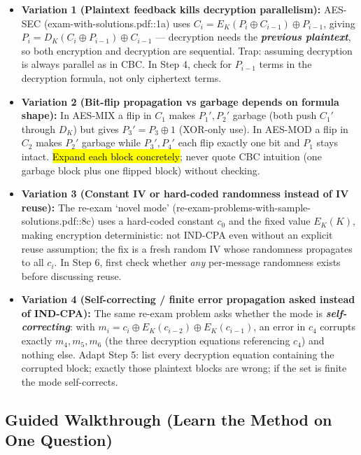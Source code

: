 \documentclass[12pt, a4paper]{article}
\newcommand{\term}[1]{\textbf{\textit{#1}}}        %
\newcommand{\imp}[1]{\hl{#1}}                       %
\begin{document}
\begin{trapbox}
\begin{itemize}
    \item \textbf{Variation 1 (Plaintext feedback kills decryption parallelism):} AES-SEC (exam-with-solutions.pdf::1a) uses $C_i = E_K(P_i \oplus C_{i-1}) \oplus P_{i-1}$, giving $P_i = D_K(C_i \oplus P_{i-1}) \oplus C_{i-1}$ --- decryption needs the \term{previous plaintext}, so both encryption and decryption are sequential.
    Trap: assuming decryption is always parallel as in CBC. In Step 4, check for $P_{i-1}$ terms in the decryption formula, not only ciphertext terms.
    \item \textbf{Variation 2 (Bit-flip propagation vs garbage depends on formula shape):} In AES-MIX a flip in $C_1$ makes $P_1', P_2'$ garbage (both push $C_1'$ through $D_K$) but gives $P_3' = P_3 \oplus 1$ (XOR-only use).
    In AES-MOD a flip in $C_2$ makes $P_2'$ garbage while $P_3', P_4'$ each flip exactly one bit and $P_1$ stays intact. \imp{Expand each block concretely}; never quote CBC intuition (one garbage block plus one flipped block) without checking.
    \item \textbf{Variation 3 (Constant IV or hard-coded randomness instead of IV reuse):} The re-exam `novel mode' (re-exam-problems-with-sample-solutions.pdf::8c) uses a hard-coded constant $c_0$ and the fixed value $E_K(K)$, making encryption deterministic: not IND-CPA even without an explicit reuse assumption;
    the fix is a fresh random IV whose randomness propagates to all $c_i$. In Step 6, first check whether \emph{any} per-message randomness exists before discussing reuse.
    \item \textbf{Variation 4 (Self-correcting / finite error propagation asked instead of IND-CPA):} The same re-exam problem asks whether the mode is \term{self-correcting}: with $m_i = c_i \oplus E_K(c_{i-2}) \oplus E_K(c_{i-1})$, an error in $c_4$ corrupts exactly $m_4, m_5, m_6$ (the three decryption equations referencing $c_4$) and nothing else.
    Adapt Step 5: list every decryption equation containing the corrupted block; exactly those plaintext blocks are wrong; if the set is finite the mode self-corrects.
\end{itemize}
\end{trapbox}

\subsection*{Guided Walkthrough (Learn the Method on One Question)}
\end{document}
